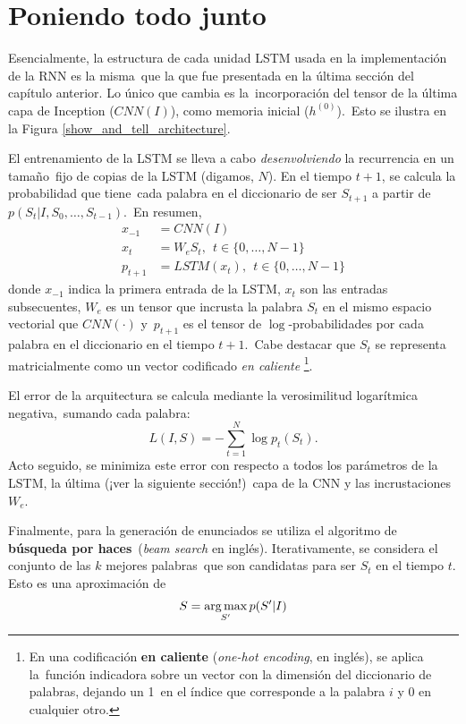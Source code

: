 \section{Poniendo todo junto}

\noindent
Esencialmente, la estructura de cada unidad LSTM usada en la implementación de la RNN es la misma\
que la que fue presentada en la última sección del capítulo anterior. Lo único que cambia es la\
incorporación del tensor de la última capa de Inception ($CNN(I)$), como memoria inicial ($h^{(0)}$).\
Esto se ilustra en la Figura \ref{show_and_tell_architecture}.\par
El entrenamiento de la LSTM se lleva a cabo \emph{desenvolviendo} la recurrencia en un tamaño\
fijo de copias de la LSTM (digamos, $N$). En el tiempo $t+1$, se calcula la probabilidad que tiene\
cada palabra en el diccionario de ser $S_{t+1}$ a partir de $p(S_t|I,S_0,\ldots,S_{t-1})$.\
En resumen,
\begin{align}
  x_{-1} &= CNN(I)\\
  x_t &= W_eS_t,\ \ t \in \{0,\ldots,N-1\}\\
  p_{t+1} &= LSTM(x_t),\ \ t \in \{0,\ldots,N-1\} \label{lstm-output}
\end{align}
donde $x_{-1}$ indica la primera entrada de la LSTM, $x_t$ son las entradas subsecuentes,
$W_e$ es un tensor que incrusta la palabra $S_t$ en el mismo espacio vectorial que $CNN(\cdot)$ y\
$p_{t+1}$ es el tensor de $\log$-probabilidades por cada palabra en el diccionario en el tiempo $t+1$.\
Cabe destacar que $S_t$ se representa matricialmente como un vector codificado \emph{en caliente}
\footnote{
  En una codificación \textbf{en caliente} (\emph{one-hot encoding}, en inglés), se aplica la\
  función indicadora sobre un vector con la dimensión del diccionario de palabras, dejando un 1\
  en el índice que corresponde a la palabra $i$ y 0 en cualquier otro.
}.\par
El error de la arquitectura se calcula mediante la verosimilitud logarítmica negativa,\
sumando cada palabra:
\begin{equation}
  L(I, S) = - \sum_{t=1}^N \log p_t(S_t).
\end{equation}
Acto seguido, se minimiza este error con respecto a todos los parámetros de la LSTM, la última (¡ver la siguiente sección!)\
capa de la CNN y las incrustaciones $W_e$.\par
Finalmente, para la generación de enunciados se utiliza el algoritmo de \textbf{búsqueda por haces}\
(\emph{beam search} en inglés). Iterativamente, se considera el conjunto de las $k$ mejores palabras\
que son candidatas para ser $S_t$ en el tiempo $t$. Esto es una aproximación de
\begin{equation}
  S = \operatorname*{arg\,max}_{S'} p(S'|I)
\end{equation}

